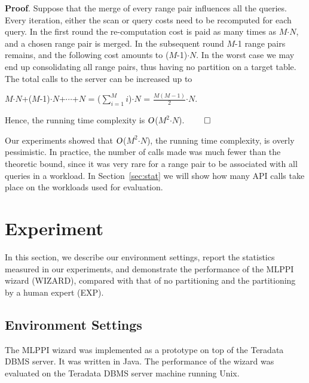 \documentclass[paper]{ieice}
\def\BigO{\mbox{\sl O}}
\begin{document}
{\bf Proof}. Suppose that the merge of every range pair influences all the queries. 
Every iteration, either the scan or query costs need to be recomputed 
for each query. 
In the first round the \hbox{re-computation} cost is paid as many times as $M${$\cdot$}$N$, 
and a chosen range pair is merged. In the subsequent round 
$M$-1 range pairs remains, and the following cost amounts to ($M$-1){$\cdot$}$N$. 
In the worst case we may end up consolidating all range pairs, thus having no partition on 
a target table. The total calls to the server can be increased up to 

\begin{center}
$M${$\cdot$}$N$+($M$-1){$\cdot$}$N$+$\cdots$+$N$ = ($\sum_{i=1}^M i$){$\cdot$}$N$ = $\frac{M(M-1)}{2}${$\cdot$}$N$. 
\end{center}

\noindent Hence, the running time complexity is $\BigO$($M^{2}${$\cdot$}$N$). $\qed$


Our experiments showed that $\BigO$($M^{2}${$\cdot$}$N$), the running time complexity, 
is overly \hbox{pessimistic}. 
In \hbox{practice}, the number of calls made was much fewer than the \hbox{theoretic} bound, 
since it was very rare for a range pair to be associated with all queries in a workload. 
In \hbox{Section}~\ref{sec:stat} we will show how many API calls take place on the workloads 
used for evaluation. 

\section{Experiment}
\label{sec:experiment}

In this section, we describe our environment settings, 
report the statistics measured in our experiments, and 
demonstrate the performance of the MLPPI wizard (WIZARD), compared with 
that of no partitioning and the partitioning by a human expert (EXP). 

\subsection{Environment Settings}
\label{sec:env_set}

The MLPPI wizard was implemented as a prototype 
on top of the Teradata DBMS server. 
It was written in Java. 
The performance of the wizard was evaluated 
on the Teradata DBMS server machine running Unix. 
\end{document}
